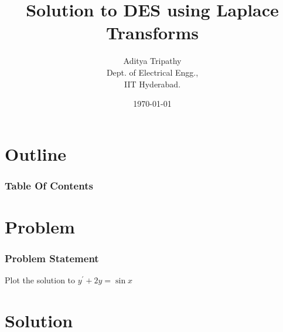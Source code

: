 \documentclass{beamer}
\title{Solution to DES using Laplace Transforms}
\author{Aditya Tripathy\\ Dept. of Electrical Engg.,\\IIT Hyderabad.}
\date{\today}
\theoremstyle{remark}
\newcommand{\myvec}[1]{\ensuremath{\begin{pmatrix}#1\end{pmatrix}}}
\let\vec\mathbf
\numberwithin{equation}{section}
\begin{document}
\begin{frame}
\titlepage
\end{frame}

\section*{Outline}
\begin{frame}
\frametitle{Table Of Contents}
\tableofcontents
\end{frame}
\section{Problem}
\begin{frame}
\frametitle{Problem Statement}
%

Plot the solution to $y^\prime + 2y = \sin x$
\end{frame}

\section{Solution}
\end{document}
